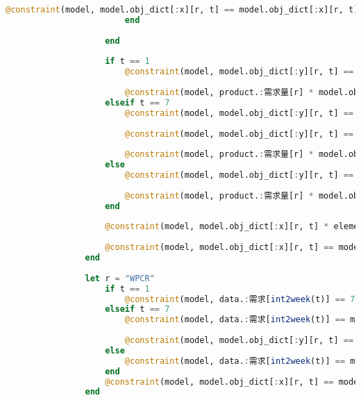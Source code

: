 \begin{appendices}
\begin{lstlisting}[language=julia]
                            @constraint(model, model.obj_dict[:x][r, t] == model.obj_dict[:x][r, t] * model.obj_dict[:ω][r, t])
                        end
    
                    end
    
                    if t == 1
                        @constraint(model, model.obj_dict[:y][r, t] == 0 + model.obj_dict[:x][r, t] - product.:需求量[r] * model.obj_dict[:x][r⁻, t])
    
                        @constraint(model, product.:需求量[r] * model.obj_dict[:x][r⁻, t] <= 0)
                    elseif t == 7
                        @constraint(model, model.obj_dict[:y][r, t] == model.obj_dict[:y][r, t-1] + model.obj_dict[:x][r, t] - product.:需求量[r] * model.obj_dict[:x][r⁻, t])
    
                        @constraint(model, model.obj_dict[:y][r, t] == 0)
    
                        @constraint(model, product.:需求量[r] * model.obj_dict[:x][r⁻, t] <= model.obj_dict[:y][r, t-1])
                    else
                        @constraint(model, model.obj_dict[:y][r, t] == model.obj_dict[:y][r, t-1] + model.obj_dict[:x][r, t] - product.:需求量[r] * model.obj_dict[:x][r⁻, t])
    
                        @constraint(model, product.:需求量[r] * model.obj_dict[:x][r⁻, t] <= model.obj_dict[:y][r, t-1])
                    end
    
                    @constraint(model, model.obj_dict[:x][r, t] * element[r].:工时消耗 == model.obj_dict[:M][r, t] * model.obj_dict[:ω][r, t])
    
                    @constraint(model, model.obj_dict[:x][r, t] == model.obj_dict[:x][r, t] * model.obj_dict[:ω][r, t])
                end
    
                let r = "WPCR"
                    if t == 1
                        @constraint(model, data.:需求[int2week(t)] == 75 + model.obj_dict[:x][r, t] - model.obj_dict[:y][r, t])
                    elseif t == 7
                        @constraint(model, data.:需求[int2week(t)] == model.obj_dict[:y][r, t-1] + model.obj_dict[:x][r, t] - model.obj_dict[:y][r, t])
    
                        @constraint(model, model.obj_dict[:y][r, t] == 0)
                    else
                        @constraint(model, data.:需求[int2week(t)] == model.obj_dict[:y][r, t-1] + model.obj_dict[:x][r, t] - model.obj_dict[:y][r, t])
                    end
                    @constraint(model, model.obj_dict[:x][r, t] == model.obj_dict[:x][r, t] * model.obj_dict[:ω][r, t])
                end
    

\end{lstlisting}
\end{appendices}

